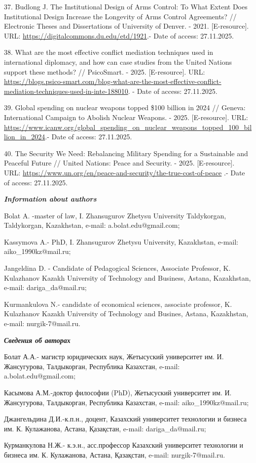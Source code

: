 \begin{refs}
37. Budlong J. The Institutional Design of Arms Control: To What Extent
Does Institutional Design Increase the Longevity of Arms Control
Agreements? // Electronic Theses and Dissertations of University of
Denver. - 2021. {[}E-resource{]}. URL:
\url{https://digitalcommons.du.edu/etd/1921}.- Date of access:
27.11.2025.

38. What are the most effective conflict mediation techniques used in
international diplomacy, and how can case studies from the United
Nations support these methods? // PsicoSmart. - 2025. {[}E-resource{]}.
URL:
\url{https://blogs.psico-smart.com/blog-what-are-the-most-effective-conflict-mediation-techniques-used-in-inte-188010}.
- Date of access: 27.11.2025.

39. Global spending on nuclear weapons topped \$100 billion in 2024 //
Geneva: International Campaign to Abolish Nuclear Weapons. - 2025.
{[}E-resource{]}. URL:
\url{https://www.icanw.org/global_spending_on_nuclear_weapons_topped_100_billion_in_2024}.-
Date of access: 27.11.2025.

40. The Security We Need: Rebalancing Military Spending for a
Sustainable and Peaceful Future // United Nations: Peace and Security. -
2025. {[}E-resource{]}. URL:
\url{https://www.un.org/en/peace-and-security/the-true-cost-of-peace} .-
Date of access: 27.11.2025.
\end{refs}

\begin{info}
\hspace{1em}\emph{{\bfseries Information about authors}}

Bolat A. -master of law, I. Zhansugurov Zhetysu University Taldykorgan,
Taldykorgan, Kazakhstan, e-mail: a.bolat.edu@gmail.com;

Kassymova A.- PhD, I. Zhansugurov Zhetysu University, Kazakhstan,
e-mail: aiko\_1990kz@mail.ru;

Jangeldina D. - Candidate of Pedagogical Sciences, Associate Professor,
K. Kulazhanov Kazakh University of Technology and Business, Astana,
Kazakhstan, e-mail: dariga\_da@mail.ru;

Kurmankulova N.- candidate of economical sciences, associate professor,
K. Kulazhanov Kazakh University of Technology and Busines, Astana,
Kazakhstan, e-mail: nurgik-7@mail.ru.

\hspace{1em}\emph{{\bfseries Сведения об авторах}}

Болат А.А.- магистр юридических наук, Жетысуский университет им. И.
Жансугурова, Талдыкорган, Республика Казахстан, e-mail:
a.bolat.edu@gmail.com;

Касымова А.М.-доктор философии (PhD), Жетысуский университет им. И.
Жансугурова, Талдыкорган, Республика Казахстан, e-mail:
aiko\_1990kz@mail.ru;

Джангельдина Д.И.-к.п.н., доцент, Казахский университет технологии и
бизнеса им. К. Кулажанова, Астана, Қазақстан, e-mail:
dariga\_da@mail.ru;

Курманкулова Н.Ж.- к.э.н., асс.профессор Казахский университет
технологии и бизнеса им. К. Кулажанова, Астана, Қазақстан, e-mail:
nurgik-7@mail.ru.
\end{info}
